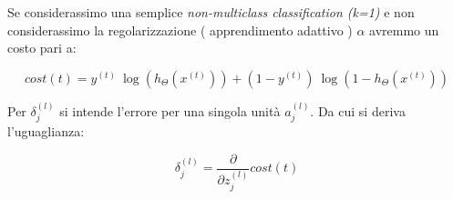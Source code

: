 \begin{definizione}
    Se considerassimo una semplice \textit{non-multiclass classification (k=1) } e non considerassimo la regolarizzazione ( apprendimento adattivo ) $\alpha$ avremmo un costo pari a:
    
\[cost(t) =y^{(t)} \ \log (h_\Theta (x^{(t)})) + (1 - y^{(t)})\ \log (1 - h_\Theta(x^{(t)}))\]
\end{definizione}
\begin{definizione}
    Per $\delta_j^{(l)}$ si intende l'errore per una singola unità $a^{(l)}_j$. Da cui si deriva l'uguaglianza:

\[\delta_j^{(l)} = \dfrac{\partial}{\partial z_j^{(l)}}cost(t)\]

\end{definizione}